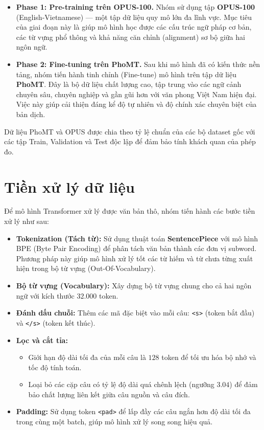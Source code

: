 \documentclass[a4paper,12pt,twoside]{report}
\begin{document}
\begin{itemize}
    \item \textbf{Phase 1: Pre-training trên OPUS-100.} Nhóm sử dụng tập \textbf{OPUS-100} (English-Vietnamese) — một tập dữ liệu quy mô lớn đa lĩnh vực. Mục tiêu của giai đoạn này là giúp mô hình học được các cấu trúc ngữ pháp cơ bản, các từ vựng phổ thông và khả năng căn chỉnh (alignment) sơ bộ giữa hai ngôn ngữ.
    \item \textbf{Phase 2: Fine-tuning trên PhoMT.} Sau khi mô hình đã có kiến thức nền tảng, nhóm tiến hành tinh chỉnh (Fine-tune) mô hình trên tập dữ liệu \textbf{PhoMT}. Đây là bộ dữ liệu chất lượng cao, tập trung vào các ngữ cảnh chuyên sâu, chuyên nghiệp và gần gũi hơn với văn phong Việt Nam hiện đại. Việc này giúp cải thiện đáng kể độ tự nhiên và độ chính xác chuyên biệt của bản dịch.
\end{itemize}

Dữ liệu PhoMT và OPUS được chia theo tỷ lệ chuẩn của các bộ dataset gốc với các tập Train, Validation và Test độc lập để đảm bảo tính khách quan của phép đo.

\section{Tiền xử lý dữ liệu}
Để mô hình Transformer xử lý được văn bản thô, nhóm tiến hành các bước tiền xử lý như sau:
\begin{itemize}
    \item \textbf{Tokenization (Tách từ):} Sử dụng thuật toán \textbf{SentencePiece} với mô hình BPE (Byte Pair Encoding) để phân tách văn bản thành các đơn vị subword. Phương pháp này giúp mô hình xử lý tốt các từ hiếm và từ chưa từng xuất hiện trong bộ từ vựng (Out-Of-Vocabulary).
    \item \textbf{Bộ từ vựng (Vocabulary):} Xây dựng bộ từ vựng chung cho cả hai ngôn ngữ với kích thước $32.000$ token.
    \item \textbf{Đánh dấu chuỗi:} Thêm các mã đặc biệt vào mỗi câu: \texttt{<s>} (token bắt đầu) và \texttt{</s>} (token kết thúc).
    \item \textbf{Lọc và cắt tỉa:} 
    \begin{itemize}
        \item Giới hạn độ dài tối đa của mỗi câu là $128$ token để tối ưu hóa bộ nhớ và tốc độ tính toán.
        \item Loại bỏ các cặp câu có tỷ lệ độ dài quá chênh lệch (ngưỡng $3.04$) để đảm bảo chất lượng liên kết giữa câu nguồn và câu đích.
    \end{itemize}
    \item \textbf{Padding:} Sử dụng token \texttt{<pad>} để lấp đầy các câu ngắn hơn độ dài tối đa trong cùng một batch, giúp mô hình xử lý song song hiệu quả.
\end{itemize}
\end{document}
